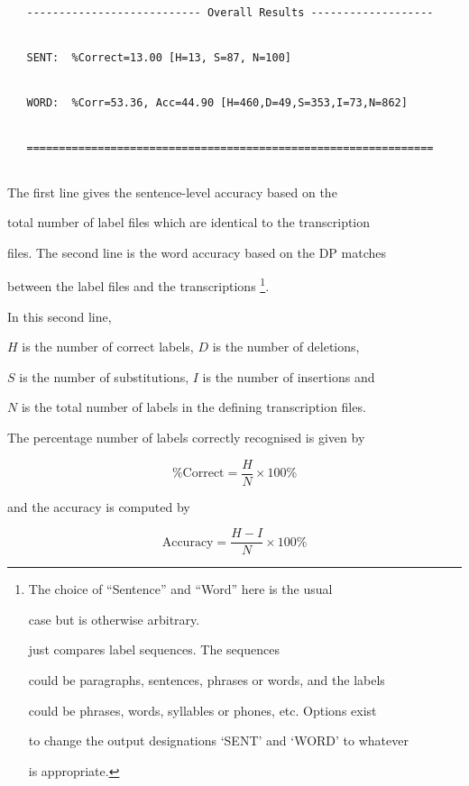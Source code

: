 \begin{verbatim}


   --------------------------- Overall Results -------------------


   SENT:  %Correct=13.00 [H=13, S=87, N=100]


   WORD:  %Corr=53.36, Acc=44.90 [H=460,D=49,S=353,I=73,N=862]


   ===============================================================


\end{verbatim}


The first line gives the sentence-level accuracy based on the 


total number of label files which are identical to the transcription


files.  The second line is the word accuracy based on the DP matches


between the label files and the transcriptions \footnote{


The choice of ``Sentence'' and ``Word'' here is the usual


case but is otherwise arbitrary.


 just compares label sequences.  The sequences


could be paragraphs, sentences, phrases or words, and the labels


could be phrases, words, syllables or phones, etc.  Options exist


to change the output designations `SENT' and `WORD' to whatever


is appropriate.}.


In this second line,


$H$ is the number of correct labels, $D$ is the number of deletions,


$S$ is the number of substitutions, $I$ is the number of insertions and


$N$ is the total number of labels in the defining transcription files.


The percentage number of labels correctly recognised is given by


\begin{equation}


   \mbox{\%Correct} = \frac{H}{N} \times 100\%


\end{equation}


and the accuracy is computed by


\begin{equation}


   \mbox{Accuracy} = \frac{H-I}{N} \times 100\%


\end{equation}





